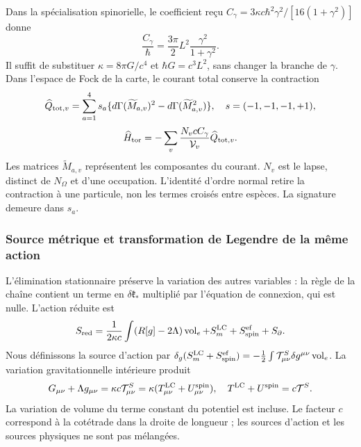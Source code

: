 Dans la spécialisation spinorielle, le coefficient reçu $C_\gamma=3\kappa c\hbar^2\gamma^2/[16(1+\gamma^2)]$ donne
\begin{equation}
\frac{C_\gamma}{\hbar}
=\frac{3\pi}{2}L^2\frac{\gamma^2}{1+\gamma^2}.
\label{hmtcuatro:gea:coeficiente-torsion}
\end{equation}
Il suffit de substituer $\kappa=8\pi G/c^4$ et $\hbar G=c^3L^2$, sans changer la branche de $\gamma$. Dans l’espace de Fock de la carte, le courant total conserve la contraction
\[
\widehat Q_{{\rm tot},v}=\sum_{a=1}^4s_a
\{d\Gamma(\widetilde M_{a,v})^2-d\Gamma(\widetilde M_{a,v}^2)\},
\quad s=(-1,-1,-1,+1),
\]
\[
\widehat H_{\rm tor}
=-\sum_v\frac{N_vcC_\gamma}{\mathcal V_v}\widehat Q_{{\rm tot},v}.
\]
Les matrices $\widetilde M_{a,v}$ représentent les composantes du courant. $N_v$ est le lapse, distinct de $N_\Omega$ et d’une occupation. L’identité d’ordre normal retire la contraction à une particule, non les termes croisés entre espèces. La signature demeure dans $s_a$.

\subsubsection{Source métrique et transformation de Legendre de la même action}
\label{hmtcuatro:gea:legendre}

L’élimination stationnaire préserve la variation des autres variables : la règle de la chaîne contient un terme en $\delta\mathfrak k_*$ multiplié par l’équation de connexion, qui est nulle. L’action réduite est
\[
S_{\rm red}=\frac1{2\kappa c}\int(R[g]-2\Lambda)\operatorname{vol}_e
+S_m^{\rm LC}+S_{\rm spin}^{\rm ef}+S_\partial.
\]
Nous définissons la source d’action par $\delta_g(S_m^{\rm LC}+S_{\rm spin}^{\rm ef})
=-\tfrac12\int\mathcal T^S_{\mu\nu}\delta g^{\mu\nu}
\operatorname{vol}_e$. La variation gravitationnelle intérieure produit
\begin{equation}
G_{\mu\nu}+\Lambda g_{\mu\nu}
=\kappa c\mathcal T^S_{\mu\nu}
=\kappa(T^{\rm LC}_{\mu\nu}+U^{\rm spin}_{\mu\nu}),
\quad T^{\rm LC}+U^{\rm spin}=c\mathcal T^S.
\label{hmtcuatro:gea:metrica}
\end{equation}
La variation de volume du terme constant du potentiel est incluse. Le facteur $c$ correspond à la cotétrade dans la droite de longueur ; les sources d’action et les sources physiques ne sont pas mélangées.

